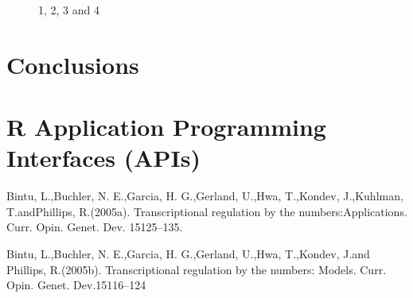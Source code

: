 \begin{figure}[H]
	\centering
	\begin{minipage}[b]{0.5\linewidth}
	\end{minipage}\hfill
	\begin{minipage}[b]{0.5\linewidth}
	\end{minipage}\hfill	
	\begin{minipage}[b]{0.5\linewidth}
	\end{minipage}\hfill
	\begin{minipage}[b]{0.5\linewidth}
	\end{minipage}\hfill
	\caption{1, 2, 3 and 4}
	\label{fig:Figure1}
\end{figure} 


\section{Conclusions}


\section{R Application Programming Interfaces (APIs)}



\begin{thebibliography}{00}

Bintu, L.,Buchler, N. E.,Garcia, H. G.,Gerland, U.,Hwa, T.,Kondev, J.,Kuhlman, T.andPhillips, R.(2005a). 
\newblock Transcriptional regulation by the numbers:Applications. 
\newblock Curr. Opin. Genet. Dev. 15125–135.

Bintu, L.,Buchler, N. E.,Garcia, H. G.,Gerland, U.,Hwa, T.,Kondev, J.and Phillips, R.(2005b). 
\newblock Transcriptional regulation by the numbers: Models.
\newblock Curr. Opin. Genet. Dev.15116–124

\end{thebibliography}

